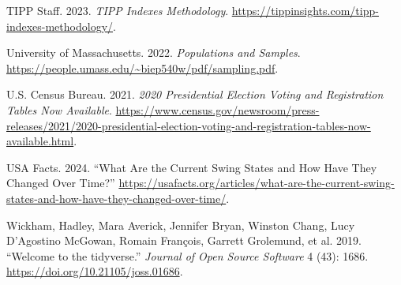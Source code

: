\documentclass[
  letterpaper,
  DIV=11,
  numbers=noendperiod]{scrartcl}
\newlength{\cslhangindent}
\newlength{\cslentryspacingunit} %
\newenvironment{CSLReferences}[2] %
 {%
  \setlength{\parindent}{0pt}
  \ifodd #1
  \let\oldpar\par
  \def\par{\hangindent=\cslhangindent\oldpar}
  \fi
  \setlength{\parskip}{#2\cslentryspacingunit}
 }%
 {}
\begin{document}
\begin{CSLReferences}{1}{0}
\leavevmode{}%
TIPP Staff. 2023. \emph{TIPP Indexes Methodology}.
\url{https://tippinsights.com/tipp-indexes-methodology/}.

\leavevmode{}%
University of Massachusetts. 2022. \emph{Populations and Samples}.
\url{https://people.umass.edu/~biep540w/pdf/sampling.pdf}.

\leavevmode{}%
U.S. Census Bureau. 2021. \emph{2020 Presidential Election Voting and
Registration Tables Now Available}.
\url{https://www.census.gov/newsroom/press-releases/2021/2020-presidential-election-voting-and-registration-tables-now-available.html}.

\leavevmode{}%
USA Facts. 2024. {``{What Are the Current Swing States and How Have They
Changed Over Time?}''}
\url{https://usafacts.org/articles/what-are-the-current-swing-states-and-how-have-they-changed-over-time/}.

\leavevmode{}%
Wickham, Hadley, Mara Averick, Jennifer Bryan, Winston Chang, Lucy
D'Agostino McGowan, Romain François, Garrett Grolemund, et al. 2019.
{``Welcome to the {tidyverse}.''} \emph{Journal of Open Source Software}
4 (43): 1686. \url{https://doi.org/10.21105/joss.01686}.

\end{CSLReferences}
\end{document}
